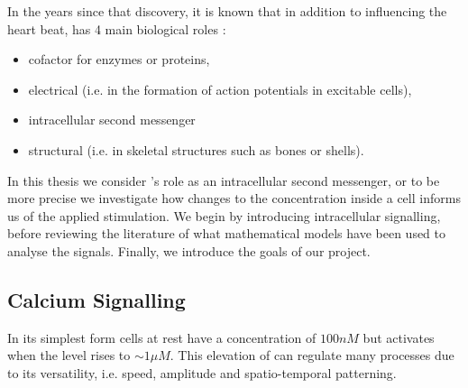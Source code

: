 \documentclass[../main.tex]{subfiles}
\begin{document}
 In the years since that discovery, it is known that in addition to influencing the heart beat,  has 4 main biological roles \cite{}:
 \begin{itemize}
 \item cofactor for enzymes or proteins,
 \item electrical (i.e. in the formation of action potentials in excitable cells),
 \item intracellular second messenger
 \item structural (i.e. in skeletal structures such as bones or shells).
 \end{itemize} 
 
 In this thesis we consider  's role as an intracellular second messenger, or to be more precise we investigate how changes to the    concentration inside a cell informs us of the applied stimulation. We begin by introducing intracellular   signalling, before reviewing the literature of what mathematical models have been used to analyse the signals. Finally, we introduce the goals of our project. 
 
 \subsection{Calcium Signalling}
 In its simplest form cells at rest have a  concentration of $100nM$ but activates when the level rises to $\sim 1 \mu M$. This elevation of  can regulate many processes due to its versatility, i.e. speed, amplitude and spatio-temporal patterning.    
\end{document}
